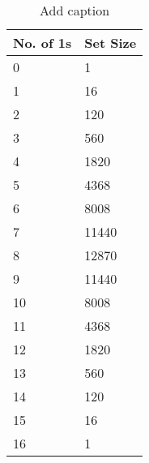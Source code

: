 \begin{table}[htbp]
  \centering
  \caption{Add caption}
    \begin{tabular}{ll}
    \toprule
    No. of 1s & Set Size \\
    \midrule
    0     & 1 \\
    1     & 16 \\
    2     & 120 \\
    3     & 560 \\
    4     & 1820 \\
    5     & 4368 \\
    6     & 8008 \\
    7     & 11440 \\
    8     & 12870 \\
    9     & 11440 \\
    10    & 8008 \\
    11    & 4368 \\
    12    & 1820 \\
    13    & 560 \\
    14    & 120 \\
    15    & 16 \\
    16    & 1 \\
    \bottomrule
    \end{tabular}%
  \label{tab:addlabel}%
\end{table}%
